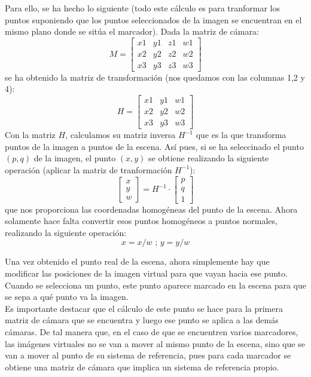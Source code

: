 \documentclass[a4paper,10pt,titlepage,oneside,openright]{book}
\begin{document}
Para ello, se ha hecho lo siguiente (todo este cálculo es para tranformar los puntos suponiendo que los puntos seleccionados de la imagen se encuentran en el mismo plano donde se sitúa el marcador). Dada la matriz de cámara:
$$M = \left[\begin{array}{cccc}
x1 & y1 & z1 & w1 \\
x2 & y2 & z2 & w2 \\
x3 & y3 & z3 & w3 
\end{array}\right]
$$
se ha obtenido la matriz de transformación (nos quedamos con las columnas 1,2 y 4):
$$H = \left[\begin{array}{ccc}
x1 & y1 & w1 \\
x2 & y2 & w2 \\
x3 & y3 & w3 
\end{array}\right]
$$
Con la matriz $H$, calculamos su matriz inversa $H^{-1}$ que es la que transforma puntos de la imagen a puntos de la escena. Así pues, si se ha seleccinado el punto $(p,q)$ de la imagen, el punto $(x,y)$ se obtiene realizando la siguiente operación (aplicar la matriz de tranformación $H^{-1}$):
$$\left[\begin{array}{c}
         x \\ y \\ w
        \end{array}\right] = H^{-1} \cdot \left[\begin{array}{c}
                                                 p \\ q \\ 1
                                                \end{array}\right]
$$
que nos proporciona las coordenadas homogéneas del punto de la escena. Ahora solamente hace falta convertir esos puntos homogéneos a puntos normales, realizando la siguiente operación:
$$x = x / w \mbox{ ; } y = y / w$$

Una vez obtenido el punto real de la escena, ahora simplemente hay que modificar las posiciones de la imagen virtual para que vayan hacia ese punto. Cuando se selecciona un punto, este punto aparece marcado en la escena para que se sepa a qué punto va la imagen. \\

Es importante destacar que el cálculo de este punto se hace para la primera matriz de cámara que se encuentra y luego ese punto se aplica a las demás cámaras. De tal manera que, en el caso de que se encuentren varios marcadores, las imágenes virtuales no se van a mover al mismo punto de la escena, sino que se van a mover al punto de su sistema de referencia, pues para cada marcador se obtiene una matriz de cámara que implica un sistema de referencia propio.
\end{document}
